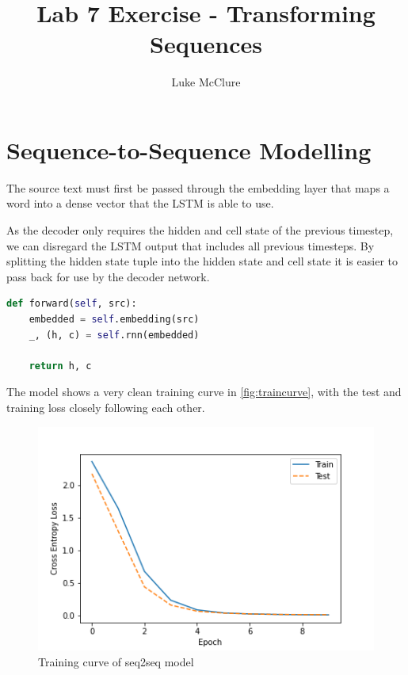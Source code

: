 \documentclass[sigconf]{acmart}
\begin{document}
\title{Lab 7 Exercise - Transforming Sequences}
\author{Luke McClure}

\maketitle
\pagestyle{myheadings}

\section{Sequence-to-Sequence Modelling}

The source text must first be passed through the embedding layer that maps a word into a dense vector that the LSTM is able to use.

As the decoder only requires the hidden and cell state of the previous timestep, we can disregard the LSTM output that includes all previous timesteps.
By splitting the hidden state tuple into the hidden state and cell state it is easier to pass back for use by the decoder network.

\begin{lstlisting}[language=Python]
def forward(self, src):
    embedded = self.embedding(src)      
    _, (h, c) = self.rnn(embedded)
        
    return h, c
\end{lstlisting}

The model shows a very clean training curve in \autoref{fig:traincurve}, with the test and training loss closely following each other.

\begin{figure}[h]
	\includegraphics[width=\linewidth]{../traincurve.png}
	\caption{Training curve of seq2seq model}
	\label{fig:traincurve}
\end{figure}	
\end{document}
